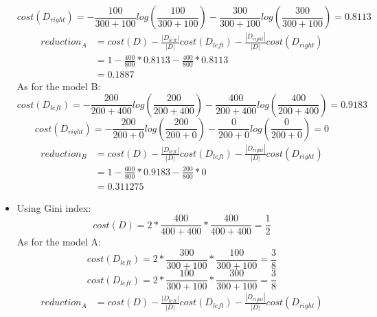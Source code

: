 \documentclass[paper=a4, fontsize=11pt]{scrartcl} %
\numberwithin{equation}{section} %
\numberwithin{figure}{section} %
\numberwithin{table}{section} %
\begin{document}
\begin{itemize}
		\begin{equation*}
		cost\left ( D_{right} \right )=-\frac{100}{300+100}log\left ( \frac{100}{300+100} \right )-\frac{300}{300+100}log\left ( \frac{300}{300+100} \right )=0.8113
		\end{equation*}
		\begin{align*}
		reduction_{A}&=cost\left ( D \right )-\frac{\left | D_{left} \right |}{\left | D \right |}cost\left ( D_{left} \right )-\frac{\left | D_{right} \right |}{\left | D \right |}cost\left ( D_{right} \right )
		\\ &=1-\frac{400}{800}*0.8113-\frac{400}{800}*0.8113
		\\ &=0.1887
		\end{align*}
		As for the model B:
		\begin{equation*}
		cost\left ( D_{left} \right )=-\frac{200}{200+400}log\left ( \frac{200}{200+400} \right )-\frac{400}{200+400}log\left ( \frac{400}{200+400} \right )=0.9183
		\end{equation*}
		\begin{equation*}
		cost\left ( D_{right} \right )=-\frac{200}{200+0}log\left ( \frac{200}{200+0} \right )-\frac{0}{200+0}log\left ( \frac{0}{200+0} \right )=0
		\end{equation*}
		\begin{align*}
		reduction_{B}&=cost\left ( D \right )-\frac{\left | D_{left} \right |}{\left | D \right |}cost\left ( D_{left} \right )-\frac{\left | D_{right} \right |}{\left | D \right |}cost\left ( D_{right} \right )
		\\ &=1-\frac{600}{800}*0.9183-\frac{200}{800}*0
		\\ &=0.311275
		\end{align*}
	\item Using Gini index:
		\begin{equation*}
		cost\left ( D \right )=2*\frac{400}{400+400}*\frac{400}{400+400}=\frac{1}{2}
		\end{equation*}
		As for the model A:
		\begin{equation*}
		cost\left ( D_{left} \right )=2*\frac{300}{300+100}*\frac{100}{300+100}=\frac{3}{8}
		\end{equation*}
		\begin{equation*}
		cost\left ( D_{left} \right )=2*\frac{100}{300+100}*\frac{300}{300+100}=\frac{3}{8}
		\end{equation*}
		\begin{align*}
		reduction_{A}&=cost\left ( D \right )-\frac{\left | D_{left} \right |}{\left | D \right |}cost\left ( D_{left} \right )-\frac{\left | D_{right} \right |}{\left | D \right |}cost\left ( D_{right} \right )

\end{align*}
\end{itemize}
\end{document}
